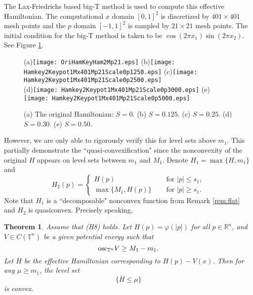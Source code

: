 \documentclass[12pt,reqno]{amsart}
\theoremstyle{plain}
\newtheorem{thm}{Theorem}[section]
\theoremstyle{remark}
\numberwithin{equation}{section}
\newcommand{\R}{\mathbb{R}}
\newcommand{\T}{\mathbb{T}}
\newcommand{\ol}{\overline}
\begin{document}
The Lax-Friedrichs based big-T method is used  to compute this effective Hamiltonian.  
The computational $x$ domain $[0,1]^2$ is discretized by $401\times 401$ mesh points and the $p$ domain $[-1,1]^2$ is sampled by $21\times 21$ mesh points. 
The initial condition for the big-T method is taken to be $\cos(2\pi x_1)\sin(2\pi x_2)$.  See Figure \ref{qtyEx2_1}.

\begin{figure}[htb]
 \centering
 (a){\texttt{[image: OriHamKeyHam2Mp21.eps]}}
 (b){\texttt{[image: Hamkey2Keypot1Mx401Mp21Scale0p1250.eps]}}
 (c){\texttt{[image: Hamkey2Keypot1Mx401Mp21Scale0p2500.eps]}}\\
 (d){\texttt{[image: Hamkey2Keypot1Mx401Mp21Scale0p3000.eps]}}
 (e){\texttt{[image: Hamkey2Keypot1Mx401Mp21Scale0p5000.eps]}}\\
 \caption{(a) The original Hamiltonian: $S=0$. (b) $S=0.125$. (c) $S=0.25$. (d) $S=0.30$. (e) $S=0.50$.} 
\label{qtyEx2_1}
\end{figure}


However, we are only able to rigorously  verify this for level sets above $m_1$. This partially demonstrate the ``quasi-convexification" since the nonconvexity of the original $H$ appears on level sets between $m_1$ and $M_1$.   Denote $H_1=\max\{H,m_1\}$ and 
\begin{equation}\label{eq-H2}
H_2(p)=
\begin{cases}
H(p) \quad &\text{ for } |p| \leq s_1,\\
\max\{M_1,H(p)\} \quad &\text{ for } |p| \geq s_1.
\end{cases}
\end{equation}
Note that $H_1$ is a ``decomposable" nonconvex function from  Remark  \ref{rem:flat} and $H_2$ is quasiconvex.
Precisely speaking, 

\begin{thm} \label{thm:conj}
Assume that {\rm (H8)} holds. 
Let $H(p)=\varphi(|p|)$ for all $p\in \R^n$, and $V\in C(\T^n)$ be a given potential energy
such that 
$$
{\rm osc}_{\T ^n}V\geq  M_1-m_1.
$$
Let $\ol{H}$ be the effective Hamiltonian corresponding to $H(p)-V(x)$. Then for any $\mu\geq m_1$, the level set
$$
\{\ol H\leq \mu\}
$$
is convex.  
\end{thm}
\end{document}

